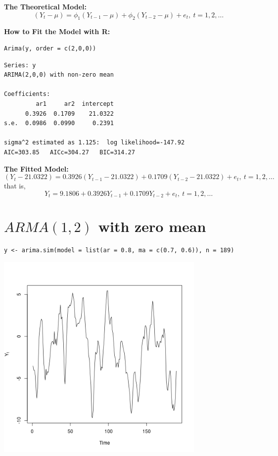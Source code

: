 \documentclass[12pt]{article}
\begin{document}
\noindent
\textbf{The Theoretical Model:} 
\[
(Y_{t} - \mu) = \phi_{1}(Y_{t - 1} - \mu) + \phi_{2}(Y_{t - 2} - \mu) + e_{t},\ t = 1,2,\ldots
\]

\noindent
\textbf{How to Fit the Model with R:}


\begin{verbatim}
Arima(y, order = c(2,0,0))
\end{verbatim}




\begin{verbatim}
Series: y 
ARIMA(2,0,0) with non-zero mean 

Coefficients:
         ar1     ar2  intercept
      0.3926  0.1709    21.0322
s.e.  0.0986  0.0990     0.2391

sigma^2 estimated as 1.125:  log likelihood=-147.92
AIC=303.85   AICc=304.27   BIC=314.27
\end{verbatim}

\noindent
\textbf{The Fitted Model:} 
\[
(Y_{t} - 21.0322 ) = 0.3926 (Y_{t - 1} - 21.0322 ) + 0.1709 (Y_{t - 2} - 21.0322 ) + e_{t},\ t = 1,2,\ldots
\]
that is,
\[
Y_{t} =  9.1806 + 0.3926 Y_{t - 1} + 0.1709 Y_{t - 2} + e_{t},\ t = 1,2,\ldots
\]
\section*{$ARMA(1,2)$ with zero mean}
\label{sec-5}


\begin{verbatim}
y <- arima.sim(model = list(ar = 0.8, ma = c(0.7, 0.6)), n = 189)
\end{verbatim}





\includegraphics[width=4.0in]{img/arma12zm.png}
\end{document}
